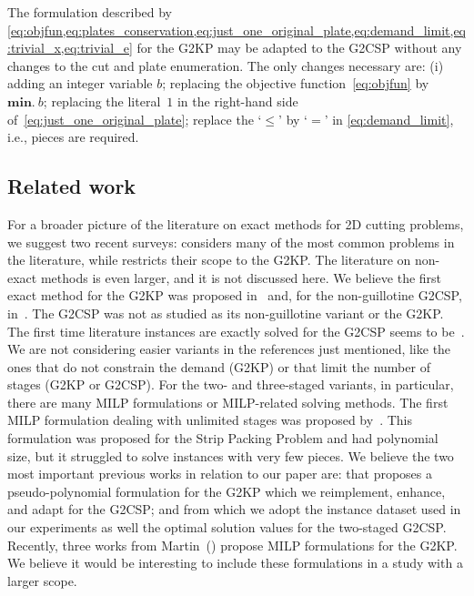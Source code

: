 \documentclass[9pt]{entcs}
\begin{document}
The formulation described by \cref{eq:objfun,eq:plates_conservation,eq:just_one_original_plate,eq:demand_limit,eq:trivial_x,eq:trivial_e} for the G2KP may be adapted to the G2CSP without any changes to the cut and plate enumeration.
The only changes necessary are: (i) adding an integer variable \(b\); replacing the objective function~\cref{eq:objfun} by~\(\bm{min.}~b\); replacing the literal~\(1\) in the right-hand side of~\cref{eq:just_one_original_plate}; replace the `\(\leq\)' by `\(=\)' in \eqref{eq:demand_limit}, i.e., pieces are required.

\subsection{Related work}

For a broader picture of the literature on exact methods for 2D cutting problems, we suggest two recent surveys: \cite{iori:2020} considers many of the most common problems in the literature, while \cite{russo:2020} restricts their scope to the G2KP.
The literature on non-exact methods is even larger, and it is not discussed here.
We believe the first exact method for the G2KP was proposed in~\cite{cw:1977} and, for the non-guillotine G2CSP, in~\cite{martello:1998}.
The G2CSP was not as studied as its non-guillotine variant or the G2KP.
The first time literature instances are exactly solved for the G2CSP seems to be~\cite{pisinger:2007}.
We are not considering easier variants in the references just mentioned, like the ones that do not constrain the demand (G2KP) or that limit the number of stages (G2KP or G2CSP).
For the two- and three-staged variants, in particular, there are many MILP formulations or MILP-related solving methods\cite{puchinger:2007,silva:2010,macedo:2010,furini:2013,nascimento:2019}.
The first MILP formulation dealing with unlimited stages was proposed by~\cite{messaoud:2008}.
This formulation was proposed for the Strip Packing Problem and had polynomial size, but it struggled to solve instances with very few pieces.
We believe the two most important previous works in relation to our paper are: \cite{furini:2016} that proposes a pseudo-polynomial formulation for the G2KP which we reimplement, enhance, and adapt for the G2CSP; and \cite{silva:2010} from which we adopt the instance dataset used in our experiments as well the optimal solution values for the two-staged G2CSP.
Recently, three works from Martin~(\cite{martin:2020:models,martin:2020:top,martin:2020:bottom}) propose MILP formulations for the G2KP.
We believe it would be interesting to include these formulations in a study with a larger scope.
\end{document}
